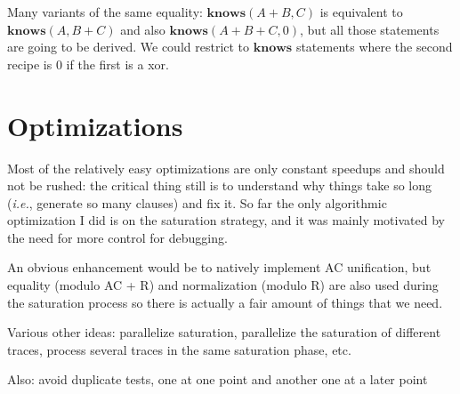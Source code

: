 \documentclass{article}
\newcommand{\mathcst}[1]{\mathrm{\textbf{#1}}}
\newcommand{\identical}{\mathcst{knows}}
\newcommand{\pair}{\mathcst{pair}}
\newcommand{\ie}{\emph{i.e.}}
\begin{document}

Many variants of the same equality:
$\identical(A+B,C)$ is equivalent to
$\identical(A,B+C)$ and also $\identical(A+B+C,0)$,
but all those statements are going to be derived.
We could restrict to $\identical$ statements where
the second recipe is $0$ if the first is a xor.

% 

\section{Optimizations} %

Most of the relatively easy optimizations are only constant speedups and
should not be rushed: the critical thing still is to understand why things
take so long (\ie, generate so many clauses) and fix it.
So far the only algorithmic optimization I did is on the saturation strategy,
and it was mainly motivated by the need for more control for debugging.

An obvious enhancement would be to natively implement AC unification,
but equality (modulo AC + R) and normalization (modulo R) are also used during 
the saturation process so there is actually a fair amount of things that we 
need.

Various other ideas: parallelize saturation, parallelize the saturation of
different traces, process several traces in the same saturation phase, etc.

Also: avoid duplicate tests, one at one point and another one at a later point
\end{document}
